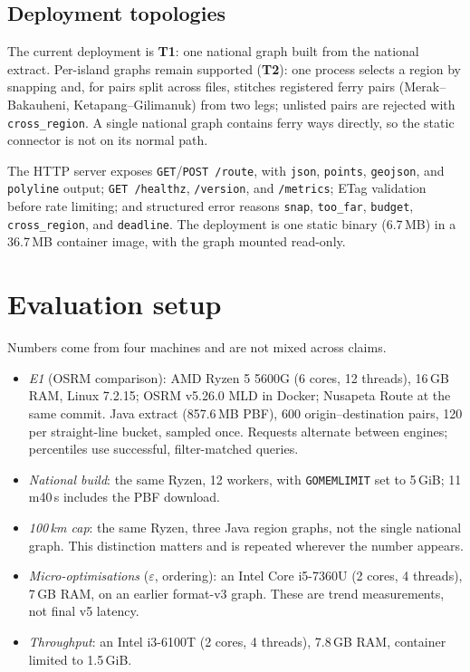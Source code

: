 \documentclass[sigconf,nonacm]{acmart}
\begin{document}
\subsection{Deployment topologies}
The current deployment is \textbf{T1}: one national graph built from the national
extract. Per-island graphs remain supported (\textbf{T2}): one process selects a
region by snapping and, for pairs split across files, stitches registered ferry
pairs (Merak--Bakauheni, Ketapang--Gilimanuk) from two legs; unlisted pairs are
rejected with \texttt{cross\_region}. A single national graph contains ferry ways
directly, so the static connector is not on its normal path.

The HTTP server exposes \texttt{GET}/\texttt{POST /route}, with
\texttt{json}, \texttt{points}, \texttt{geojson}, and \texttt{polyline} output;
\texttt{GET /healthz}, \texttt{/version}, and \texttt{/metrics}; ETag validation
before rate limiting; and structured error reasons \texttt{snap},
\texttt{too\_far}, \texttt{budget}, \texttt{cross\_region}, and
\texttt{deadline}. The deployment is one static binary (6.7\,MB) in a 36.7\,MB
container image, with the graph mounted read-only.

\section{Evaluation setup}
Numbers come from four machines and are not mixed across claims.
\begin{itemize}
  \item \emph{E1} (OSRM comparison): AMD Ryzen 5 5600G (6 cores, 12 threads),
        16\,GB RAM, Linux 7.2.15; OSRM v5.26.0 MLD in Docker; Nusapeta Route at the same
        commit. Java extract (857.6\,MB PBF), 600 origin--destination pairs, 120
        per straight-line bucket, sampled once. Requests alternate between
        engines; percentiles use successful, filter-matched queries.
  \item \emph{National build}: the same Ryzen, 12 workers, with
        \texttt{GOMEMLIMIT} set to 5\,GiB; 11\,m40\,s includes the PBF download.
  \item \emph{100\,km cap}: the same Ryzen, three Java region graphs, not the
        single national graph. This distinction matters and is repeated wherever
        the number appears.
  \item \emph{Micro-optimisations} ($\varepsilon$, ordering): an Intel Core
        i5-7360U (2 cores, 4 threads), 7\,GB RAM, on an earlier format-v3 graph.
        These are trend measurements, not final v5 latency.
  \item \emph{Throughput}: an Intel i3-6100T (2 cores, 4 threads), 7.8\,GB RAM,
        container limited to 1.5\,GiB.
\end{itemize}
\end{document}

